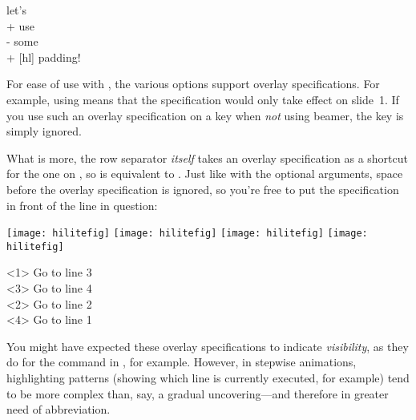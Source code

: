 \documentclass[a4paper]{article}
\def\refc{\refCom*}
\def\refk{\refKey*}
\begin{document}
\begin{texexp}
\begin{pseudo}[hpad, hsep=1em, indent-length=1em]
    let's                                       \\+
        use                                     \\-
    some                                        \\+ [hl]
        padding!
\end{pseudo}
\end{texexp}

\noindent\label{p:overlays}%
For ease of use with , the various
 options support  overlay
specifications. For example, using \code{\refk{hl}<1>} means that the
\refk{hl} specification would only take effect on slide~1. If you use such an
overlay specification on a key when \emph{not} using beamer, the key is simply
ignored.

What is more, the row separator \emph{itself} takes an overlay specification
as a shortcut for the one on \refk{hl}, so \code{\refc{\bslash}<1,2-4>} is
equivalent to \code{\refc{\bslash}[\refk{hl}<1,2-4>]}. Just like with the
optional arguments, space before the overlay specification is ignored, so
you're free to put the specification in front of the line in question:

\medskip

\noindent
\texttt{[image: hilitefig]}\hfill
\texttt{[image: hilitefig]}\hfill
\texttt{[image: hilitefig]}\hfill
\texttt{[image: hilitefig]}

\medskip

\begin{texexp}
\begin{pseudo}
    <1>  Go to line 3                           \\
    <3>  Go to line 4                           \\
    <2>  Go to line 2                           \\
    <4>  Go to line 1                           \\
\end{pseudo}
\end{texexp}
%
You might have expected these overlay specifications to indicate
\emph{visibility}, as they do for the  command in , for
example. However, in stepwise animations, highlighting patterns (showing which
line is currently executed, for example) tend to be more complex than, say, a
gradual uncovering---and therefore in greater need of abbreviation.
\end{document}
